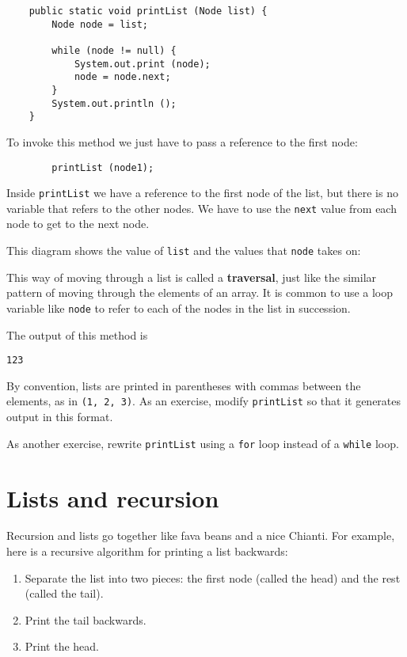 \begin{verbatim}
    public static void printList (Node list) {
        Node node = list;

        while (node != null) {
            System.out.print (node);
            node = node.next;
        }
        System.out.println ();
    }
\end{verbatim}
%
To invoke this method we just have to pass a reference to the
first node:

\begin{verbatim}
        printList (node1);
\end{verbatim}
%
Inside {\tt printList} we have a reference to the first node
of the list, but there is no variable that refers to the other
nodes.  We have to use the {\tt next} value from each node
to get to the next node.

This diagram shows the value of {\tt list} and the values that
{\tt node} takes on:


This way of moving through a list is called a {\bf traversal},
just like the similar pattern of moving through the elements of
an array.  It is common to use a loop variable like {\tt node}
to refer to each of the nodes in the list in succession.


The output of this method is

\begin{verbatim}
123
\end{verbatim}
%
By convention, lists are printed in parentheses with commas
between the elements, as in {\tt (1, 2, 3)}.  As an exercise, modify
{\tt printList} so that it generates output in this format.

As another exercise, rewrite {\tt printList} using a {\tt for} loop
instead of a {\tt while} loop.

\section{Lists and recursion}

Recursion and lists go together like fava beans and a nice
Chianti.  For example, here is a recursive algorithm for printing
a list backwards:


\begin{enumerate}

\item Separate the list into two pieces: the first node (called
the head) and the rest (called the tail).

\item Print the tail backwards.

\item Print the head.

\end{enumerate}

